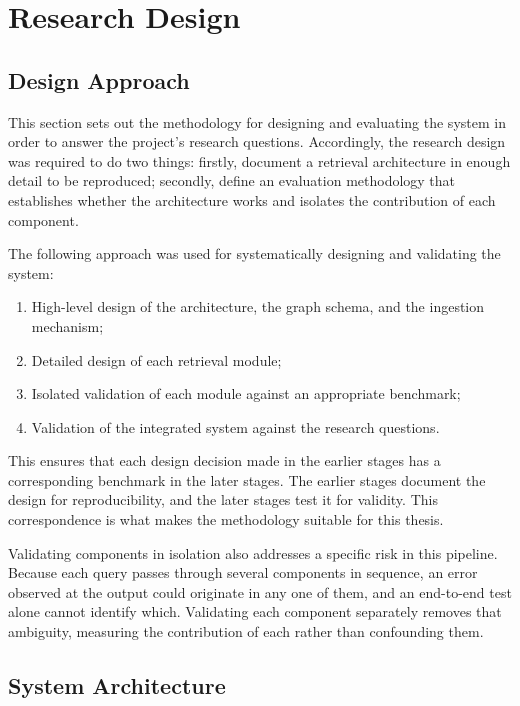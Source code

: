 \section{Research Design}
\label{sec:research-design}

\subsection{Design Approach}
\label{subsec:design-approach}

This section sets out the methodology for designing and evaluating the system in order to answer the project's research questions. Accordingly, the research design was required to do two things: firstly, document a retrieval architecture in enough detail to be reproduced; secondly, define an evaluation methodology that establishes whether the architecture works and isolates the contribution of each component.

The following approach was used for systematically designing and validating the system:

\begin{enumerate}
    \item High-level design of the architecture, the graph schema, and the ingestion mechanism;
    \item Detailed design of each retrieval module;
    \item Isolated validation of each module against an appropriate benchmark;
    \item Validation of the integrated system against the research questions.
\end{enumerate}

This ensures that each design decision made in the earlier stages has a corresponding benchmark in the later stages. The earlier stages document the design for reproducibility, and the later stages test it for validity. This correspondence is what makes the methodology suitable for this thesis.

Validating components in isolation also addresses a specific risk in this pipeline. Because each query passes through several components in sequence, an error observed at the output could originate in any one of them, and an end-to-end test alone cannot identify which. Validating each component separately removes that ambiguity, measuring the contribution of each rather than confounding them.

\subsection{System Architecture}
\label{subsec:system-architecture}

